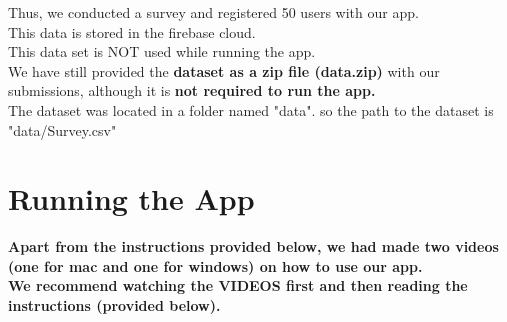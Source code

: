 \documentclass[11pt]{report}
\begin{document}
Thus, we conducted a survey and registered 50 users with our app. \\

This data is stored in the firebase cloud.\\

This data set is NOT used while running the app. \\

 We have still provided the {\bf dataset as a zip file (data.zip)} with our submissions, although it is  {\bf  not required to run the app.} \\
 
 The dataset was located in a folder named "data". so the path to the dataset is "data/Survey.csv"
 

\chapter{Running the App}

\textbf{Apart from the instructions provided below, we had made two videos (one for mac and one for windows) on how to use our app.}\\ 
\textbf{We recommend {\Large watching the VIDEOS first} and then reading the instructions (provided below).}
\end{document}
